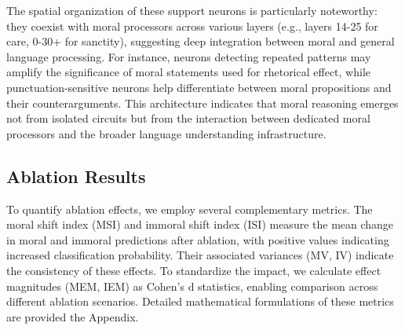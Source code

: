 \documentclass[runninghheads]{llncs}
\begin{document}
The spatial organization of these support neurons is particularly noteworthy: they coexist with moral processors across various layers (e.g., layers 14-25 for care, 0-30+ for sanctity), suggesting deep integration between moral and general language processing. For instance, neurons detecting repeated patterns may amplify the significance of moral statements used for rhetorical effect, while punctuation-sensitive neurons help differentiate between moral propositions and their counterarguments. This architecture indicates that moral reasoning emerges not from isolated circuits but from the interaction between dedicated moral processors and the broader language understanding infrastructure.










\subsection{Ablation Results}

To quantify ablation effects, we employ several complementary metrics. The moral shift index (MSI) and immoral shift index (ISI) measure the mean change in moral and immoral predictions after ablation, with positive values indicating increased classification probability. Their associated variances (MV, IV) indicate the consistency of these effects. To standardize the impact, we calculate effect magnitudes (MEM, IEM) as Cohen's d statistics, enabling comparison across different ablation scenarios. Detailed mathematical formulations of these metrics are provided the Appendix.
\end{document}
